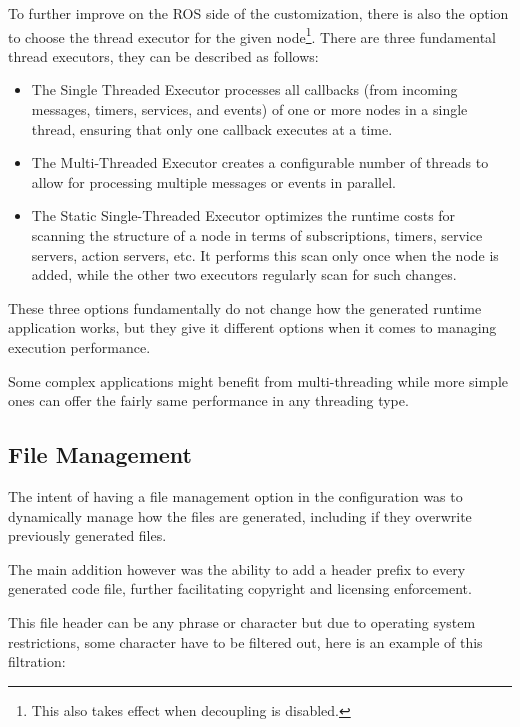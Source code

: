 To further improve on the \gls{ROS} side of the customization, there is also the option to choose the thread executor for the given node\footnote{This also takes effect when decoupling is disabled.}. There are three fundamental thread executors, they can be described as follows:

\begin{itemize} 
	\item The Single Threaded Executor processes all callbacks (from incoming messages, timers, services, and events) of one or more nodes in a single thread, ensuring that only one callback executes at a time.
	\item The Multi-Threaded Executor creates a configurable number of threads to allow for processing multiple messages or events in parallel.
	\item  The Static Single-Threaded Executor optimizes the runtime costs for scanning the structure of a node in terms of subscriptions, timers, service servers, action servers, etc. It performs this scan only once when the node is added, while the other two executors regularly scan for such changes. 
\end{itemize}

These three options fundamentally do not change how the generated runtime application works, but they give it different options when it comes to managing execution performance.

\begin{tcolorbox}[colback=blue!5, colframe=blue!40!black] Some complex applications might benefit from multi-threading while more simple ones can offer the fairly same performance in any threading type.
\end{tcolorbox}


\subsection{File Management}
\label{sec:impl_file_mng}

The intent of having a file management option in the configuration was to dynamically manage how the files are generated, including if they overwrite previously generated files.

The main addition however was the ability to add a header prefix to every generated code file, further facilitating copyright and licensing enforcement.

This file header can be any phrase or character but due to operating system restrictions, some character have to be filtered out, here is an example of this filtration:

